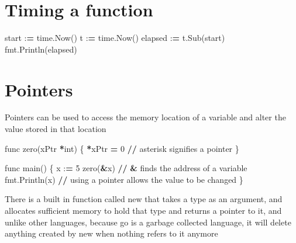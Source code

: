 \documentclass[]{book}
\newenvironment{Shaded}{\begin{snugshade}}{\end{snugshade}}
\newcommand{\BuiltInTok}[1]{#1}
\newcommand{\DecValTok}[1]{\textcolor[rgb]{0.00,0.00,0.81}{#1}}
\newcommand{\NormalTok}[1]{#1}
\newcommand{\OperatorTok}[1]{\textcolor[rgb]{0.81,0.36,0.00}{\textbf{#1}}}
\begin{document}
\hypertarget{timing-a-function}{%
\section{Timing a function}\label{timing-a-function}}

\begin{Shaded}
\begin{Highlighting}[]
\NormalTok{start :}\OperatorTok{=}\NormalTok{ time.Now()}
\NormalTok{t :}\OperatorTok{=}\NormalTok{ time.Now()}
\NormalTok{elapsed :}\OperatorTok{=}\NormalTok{ t.Sub(start)}
\NormalTok{fmt.Println(elapsed)}
\end{Highlighting}
\end{Shaded}

\hypertarget{pointers}{%
\section{Pointers}\label{pointers}}

Pointers can be used to access the memory location of a variable and alter the value stored in that location

\begin{Shaded}
\begin{Highlighting}[]
\NormalTok{func zero(xPtr }\OperatorTok{*}\BuiltInTok{int}\NormalTok{) \{                                              }
    \OperatorTok{*}\NormalTok{xPtr }\OperatorTok{=} \DecValTok{0} \OperatorTok{//}\NormalTok{ asterisk signifies a pointer                                                       }
\NormalTok{\}                                                                   }
                                                                    
\NormalTok{func main() \{                                                       }
\NormalTok{    x :}\OperatorTok{=} \DecValTok{5}                                                          
\NormalTok{    zero(}\OperatorTok{&}\NormalTok{x) }\OperatorTok{//} \OperatorTok{&}\NormalTok{ finds the address of a variable                                                       }
\NormalTok{    fmt.Println(x) }\OperatorTok{//}\NormalTok{ using a pointer allows the value to be changed}
\NormalTok{\}                                                                   }
\end{Highlighting}
\end{Shaded}

There is a built in function called new that takes a type as an argument, and allocates sufficient memory to hold that type and returns a pointer to it, and unlike other languages, because go is a garbage collected language, it will delete anything created by new when nothing refers to it anymore
\end{document}
